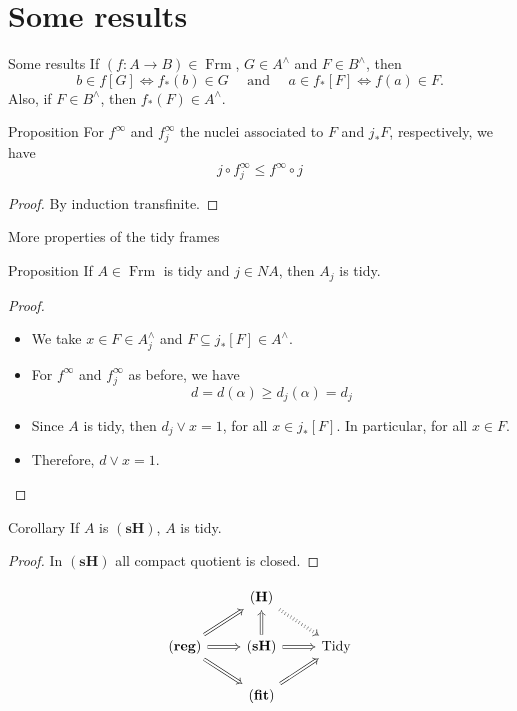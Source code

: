\documentclass[compress,12pt]{beamer}
\DeclareMathOperator{\Frm}{Frm}
\begin{document}
\section{Some results}

\begin{frame}[fragile]{Some results}
If $(f\colon A\to B)\in \Frm$, $G\in A^\wedge$ and $F\in B^\wedge$, then
\[
b\in f[G]\iff f_*(b)\in G\quad\mbox{ and }\quad a\in f_*[F]\iff f(a)\in F.
\]
Also, if $F\in B^\wedge$, then $f_*(F)\in A^\wedge$.
\begin{block}{Proposition}
For $f^\infty$ and $f_j^\infty$ the nuclei associated to $F$ and $j_*F$, respectively, we have
\[
j\circ f_j^\infty\leq f^\infty \circ j
\]
\end{block}
\begin{proof}
By induction transfinite.
\end{proof}
\end{frame}

\begin{frame}{More properties of the tidy frames}
\begin{block}{Proposition}
If $A\in \Frm$ is tidy and $j\in NA$, then $A_j$ is tidy.
\end{block}
\begin{proof}
\begin{itemize}
\item We take $x\in F\in A_j^\wedge$ and $F\subseteq j_*[F]\in A^\wedge$.
\item For $f^\infty$ and $f_j^\infty$ as before, we have
\[
d=d(\alpha)\geq d_j(\alpha)=d_j
\]
\item Since $A$ is tidy, then $d_j\vee x=1$, for all $x\in j_*[F]$. In particular, for all $x\in F$.
\item Therefore, $d\vee x=1$.
\end{itemize}
\end{proof}

\end{frame}

\begin{frame}[fragile]
\begin{block}{Corollary}
If $A$ is $\mathbf{(sH)}$, $A$ is tidy.
\end{block}
\begin{proof}
In $\mathbf{(sH)}$ all compact quotient is closed.
\end{proof}

\[\begin{tikzcd}
	& {\mathbf{(H)}} \\
	{\mathbf{(reg)}} & {\mathbf{(sH)}} & {\text{Tidy}} \\
	& {\mathbf{(fit)}}
	\arrow[Rightarrow, dotted, from=1-2, to=2-3]
	\arrow[Rightarrow, from=2-1, to=1-2]
	\arrow[Rightarrow, from=2-1, to=2-2]
	\arrow[Rightarrow, from=2-1, to=3-2]
	\arrow[Rightarrow, from=2-2, to=1-2]
	\arrow[Rightarrow, from=2-2, to=2-3]
	\arrow[Rightarrow, from=3-2, to=2-3]
\end{tikzcd}\]
\end{frame}
\end{document}
